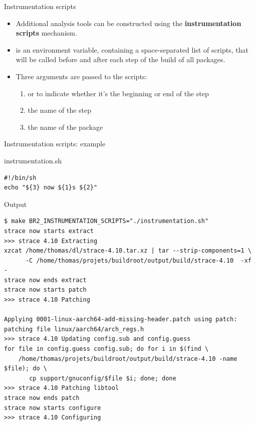 \begin{frame}{Instrumentation scripts}
  \begin{itemize}
  \item Additional analysis tools can be constructed using the {\bf
      instrumentation scripts} mechanism.
  \item {} is an environment variable,
    containing a space-separated list of scripts, that will be called
    before and after each step of the build of all packages.
  \item Three arguments are passed to the scripts:
    \begin{enumerate}
    \item {} or  to indicate whether it's the
      beginning or end of the step
    \item the name of the step
    \item the name of the package
    \end{enumerate}
  \end{itemize}
\end{frame}

\begin{frame}[fragile]{Instrumentation scripts: example}
  \begin{block}{instrumentation.sh}
{\tiny
\begin{verbatim}
#!/bin/sh
echo "${3} now ${1}s ${2}"
\end{verbatim}}
  \end{block}

  \begin{block}{Output}
{\tiny
\begin{verbatim}
$ make BR2_INSTRUMENTATION_SCRIPTS="./instrumentation.sh"
strace now starts extract
>>> strace 4.10 Extracting
xzcat /home/thomas/dl/strace-4.10.tar.xz | tar --strip-components=1 \
      -C /home/thomas/projets/buildroot/output/build/strace-4.10  -xf -
strace now ends extract
strace now starts patch
>>> strace 4.10 Patching

Applying 0001-linux-aarch64-add-missing-header.patch using patch: 
patching file linux/aarch64/arch_regs.h
>>> strace 4.10 Updating config.sub and config.guess
for file in config.guess config.sub; do for i in $(find \
    /home/thomas/projets/buildroot/output/build/strace-4.10 -name $file); do \
       cp support/gnuconfig/$file $i; done; done
>>> strace 4.10 Patching libtool
strace now ends patch
strace now starts configure
>>> strace 4.10 Configuring
\end{verbatim}}
  \end{block}

\end{frame}

